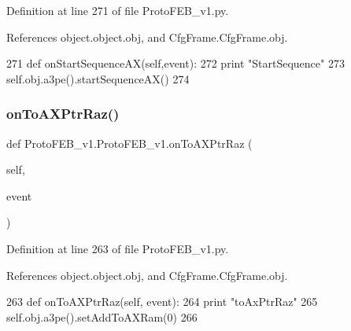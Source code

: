 Definition at line 271 of file Proto\+F\+E\+B\+\_\+v1.\+py.



References object.\+object.\+obj, and Cfg\+Frame.\+Cfg\+Frame.\+obj.


\begin{DoxyCode}
271     \textcolor{keyword}{def }onStartSequenceAX(self,event):
272         \textcolor{keywordflow}{print} \textcolor{stringliteral}{"StartSequence"}
273         self.obj.a3pe().startSequenceAX()
274 
\end{DoxyCode}
\mbox{\label{classProtoFEB__v1_1_1ProtoFEB__v1_ae58fe734ecb48ef9b4baa8583598c17f}} 
\subsubsection{\texorpdfstring{on\+To\+A\+X\+Ptr\+Raz()}{onToAXPtrRaz()}}
{\footnotesize\ttfamily def Proto\+F\+E\+B\+\_\+v1.\+Proto\+F\+E\+B\+\_\+v1.\+on\+To\+A\+X\+Ptr\+Raz (\begin{DoxyParamCaption}\item[{}]{self,  }\item[{}]{event }\end{DoxyParamCaption})}



Definition at line 263 of file Proto\+F\+E\+B\+\_\+v1.\+py.



References object.\+object.\+obj, and Cfg\+Frame.\+Cfg\+Frame.\+obj.


\begin{DoxyCode}
263     \textcolor{keyword}{def }onToAXPtrRaz(self, event):
264         \textcolor{keywordflow}{print} \textcolor{stringliteral}{"toAxPtrRaz"}
265         self.obj.a3pe().setAddToAXRam(0)
266 
\end{DoxyCode}
\mbox{\label{classProtoFEB__v1_1_1ProtoFEB__v1_a594e7f8dc94c4e28ac5d2132238983b6}} 
